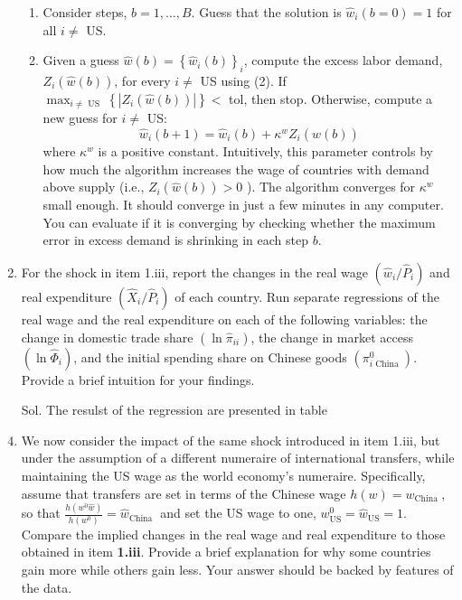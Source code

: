 \documentclass[12pt,oneside,reqno]{article}
\begin{document}
\begin{enumerate}[leftmargin=*, label=\textbf{(\roman*)}]
    \begin{enumerate}[leftmargin=*,label=\textbf{(\alph*)}]
        \item Consider steps, $b=1, \ldots, B$. Guess that the solution is $\hat{w}_{i}(b=0)=1$ for all $i \neq$ US.
        \item Given a guess $\hat{w}(b)=\left\{\hat{w}_{i}(b)\right\}_{i}$, compute the excess labor demand, $Z_{i}(\hat{w}(b))$, for every $i \neq$ US using (2). If $\max _{i \neq \text { US }}\left\{\left|Z_{i}(\hat{w}(b))\right|\right\}<$ tol, then stop. Otherwise, compute a new guess for $i \neq$ US:
        \begin{equation*}
            \hat{w}_{i}(b+1)=\hat{w}_{i}(b)+\kappa^{w} Z_{i}(\hat{w}(b))
        \end{equation*}
        where $\kappa^{w}$ is a positive constant. Intuitively, this parameter controls by how much the algorithm increases the wage of countries with demand above supply (i.e., $Z_{i}(\hat{w}(b))>0$ ). The algorithm converges for $\kappa^{w}$ small enough. It should converge in just a few minutes in any computer. You can evaluate if it is converging by checking whether the maximum error in excess demand is shrinking in each step $b$.
    \end{enumerate}
    \item For the shock in item 1.iii, report the changes in the real wage $\left(\hat{w}_{i} / \hat{P}_{i}\right)$ and real expenditure $\left(\hat{X}_{i} / \hat{P}_{i}\right)$ of each country. Run separate regressions of the real wage and the real expenditure on each of the following variables: the change in domestic trade share $\left(\ln \hat{\pi}_{i i}\right)$, the change in market access $\left(\ln \hat{\Phi}_{i}\right)$, and the initial spending share on Chinese goods $\left(\pi_{i \text { China }}^{0}\right)$. Provide a brief intuition for your findings.
    \item[Sol.] The resulst of the regression are presented in table
    
    \FloatBarrier
    \item We now consider the impact of the same shock introduced in item 1.iii, but under the assumption of a different numeraire of international transfers, while maintaining the US wage as the world economy's numeraire. Specifically, assume that transfers are set in terms of the Chinese wage $h(w)=w_{\text {China }}$, so that $\frac{h\left(w^{0} \hat{w}\right)}{h\left(w^{0}\right)}=\hat{w}_{\text {China }}$ and set the US wage to one, $w_{\mathrm{US}}^{0}=\hat{w}_{\mathrm{US}}=1$. Compare the implied changes in the real wage and real expenditure to those obtained in item \textbf{1.iii}. Provide a brief explanation for why some countries gain more while others gain less. Your answer should be backed by features of the data.

\end{enumerate}
\end{document}
